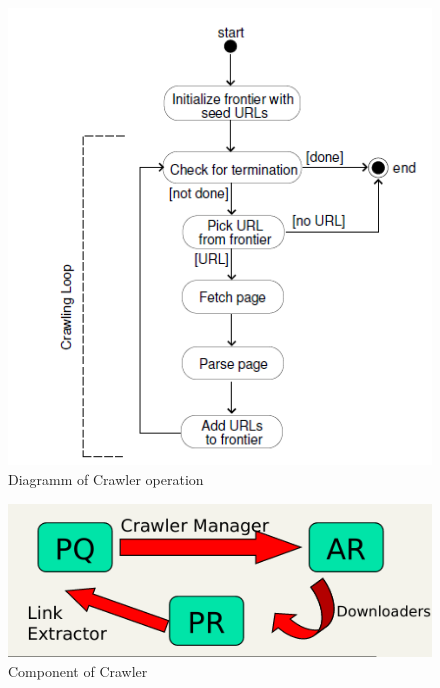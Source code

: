 \begin{figure}
    \caption {Diagramm of Crawler operation}
    \label{img:crawler}
    \includegraphics[width=\textwidth]{Images/crawler}
\end{figure}

\begin{figure}
    \caption{Component of Crawler}
    \label{img:crawlerElement}
    \includegraphics[width=\textwidth]{Images/crawlerComponents}
\end{figure}

